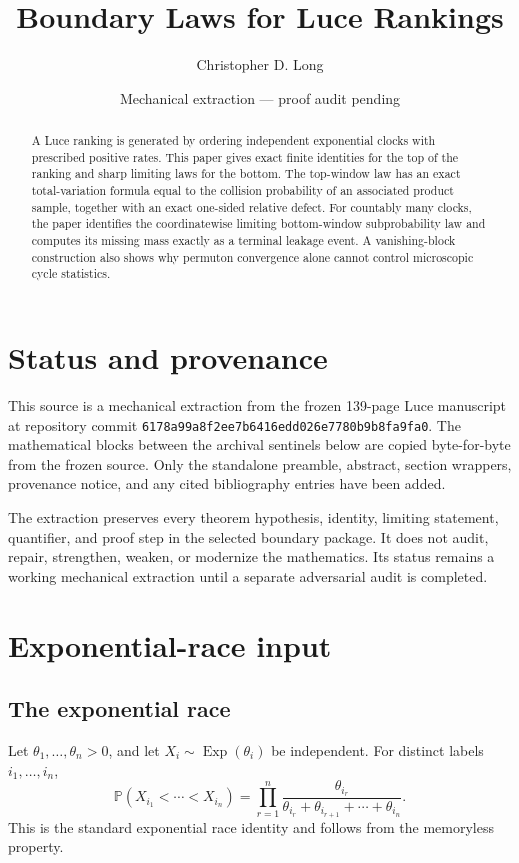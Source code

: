 \documentclass[11pt]{article}
\title{Boundary Laws for Luce Rankings}
\author{Christopher D. Long}
\date{Mechanical extraction --- proof audit pending}
\theoremstyle{remark}
\newcommand{\Pp}{\mathbb P}
\newcommand{\Exp}{\operatorname{Exp}}
\begin{document}
\maketitle
\begin{abstract}
A Luce ranking is generated by ordering independent exponential clocks with prescribed positive rates. This paper gives exact finite identities for the top of the ranking and sharp limiting laws for the bottom. The top-window law has an exact total-variation formula equal to the collision probability of an associated product sample, together with an exact one-sided relative defect. For countably many clocks, the paper identifies the coordinatewise limiting bottom-window subprobability law and computes its missing mass exactly as a terminal leakage event. A vanishing-block construction also shows why permuton convergence alone cannot control microscopic cycle statistics.
\end{abstract}
\tableofcontents
\section{Status and provenance}
This source is a mechanical extraction from the frozen 139-page Luce manuscript at repository commit \texttt{6178a99a8f2ee7b6416edd026e7780b9b8fa9fa0}. The mathematical blocks between the archival sentinels below are copied byte-for-byte from the frozen source. Only the standalone preamble, abstract, section wrappers, provenance notice, and any cited bibliography entries have been added.

The extraction preserves every theorem hypothesis, identity, limiting statement, quantifier, and proof step in the selected boundary package. It does not audit, repair, strengthen, weaken, or modernize the mathematics. Its status remains a working mechanical extraction until a separate adversarial audit is completed.
\section{Exponential-race input}
\subsection{The exponential race}
Let \(\theta_1,\ldots,\theta_n>0\), and let \(X_i\sim\Exp(\theta_i)\) be independent.  For distinct labels \(i_1,\ldots,i_n\),
\[
\Pp(X_{i_1}<\cdots<X_{i_n})
= \prod_{r=1}^n
 \frac{\theta_{i_r}}{\theta_{i_r}+\theta_{i_{r+1}}+\cdots+\theta_{i_n}}.
\]
This is the standard exponential race identity and follows from the memoryless property.
\end{document}
